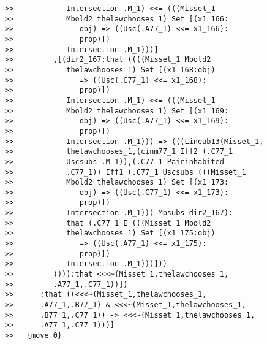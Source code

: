 \documentclass[12pt]{article}
\begin{document}
\begin{verbatim}
>>            Intersection .M_1) <<= (((Misset_1
>>            Mbold2 thelawchooses_1) Set [(x1_166:
>>               obj) => ((Usc(.A77_1) <<= x1_166):
>>               prop)])
>>            Intersection .M_1)))]
>>         ,[(dir2_167:that ((((Misset_1 Mbold2
>>            thelawchooses_1) Set [(x1_168:obj)
>>               => ((Usc(.C77_1) <<= x1_168):
>>               prop)])
>>            Intersection .M_1) <<= (((Misset_1
>>            Mbold2 thelawchooses_1) Set [(x1_169:
>>               obj) => ((Usc(.A77_1) <<= x1_169):
>>               prop)])
>>            Intersection .M_1))) => (((Lineab13(Misset_1,
>>            thelawchooses_1,(cinm77_1 Iff2 (.C77_1
>>            Uscsubs .M_1)),(.C77_1 Pairinhabited
>>            .C77_1)) Iff1 (.C77_1 Uscsubs (((Misset_1
>>            Mbold2 thelawchooses_1) Set [(x1_173:
>>               obj) => ((Usc(.C77_1) <<= x1_173):
>>               prop)])
>>            Intersection .M_1))) Mpsubs dir2_167):
>>            that (.C77_1 E (((Misset_1 Mbold2
>>            thelawchooses_1) Set [(x1_175:obj)
>>               => ((Usc(.A77_1) <<= x1_175):
>>               prop)])
>>            Intersection .M_1)))]))
>>         )))):that <<<~(Misset_1,thelawchooses_1,
>>         .A77_1,.C77_1))])
>>      :that ((<<<~(Misset_1,thelawchooses_1,
>>      .A77_1,.B77_1) & <<<~(Misset_1,thelawchooses_1,
>>      .B77_1,.C77_1)) -> <<<~(Misset_1,thelawchooses_1,
>>      .A77_1,.C77_1)))]
>>   {move 0}



\end{verbatim}
\end{document}
